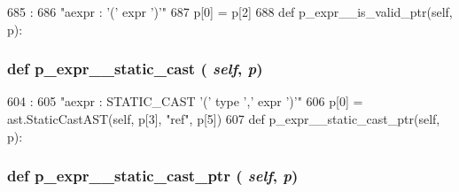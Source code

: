 \begin{DoxyCode}
685                                :
686         "aexpr : '(' expr ')'"
687         p[0] = p[2]
688 
    def p_expr__is_valid_ptr(self, p):
\end{DoxyCode}
\hypertarget{classslicc_1_1parser_1_1SLICC_ae253508b9c4220db9770ebb3e7b3067c}{
\subsubsection[{p\_\-expr\_\-\_\-static\_\-cast}]{\setlength{\rightskip}{0pt plus 5cm}def p\_\-expr\_\-\_\-static\_\-cast ( {\em self}, \/   {\em p})}}
\label{classslicc_1_1parser_1_1SLICC_ae253508b9c4220db9770ebb3e7b3067c}



\begin{DoxyCode}
604                                     :
605         "aexpr : STATIC_CAST '(' type ',' expr ')'"
606         p[0] = ast.StaticCastAST(self, p[3], "ref", p[5])
607 
    def p_expr__static_cast_ptr(self, p):
\end{DoxyCode}
\hypertarget{classslicc_1_1parser_1_1SLICC_a82e8e91f1fd31d30fbf563ddd8bca5f9}{
\subsubsection[{p\_\-expr\_\-\_\-static\_\-cast\_\-ptr}]{\setlength{\rightskip}{0pt plus 5cm}def p\_\-expr\_\-\_\-static\_\-cast\_\-ptr ( {\em self}, \/   {\em p})}}
\label{classslicc_1_1parser_1_1SLICC_a82e8e91f1fd31d30fbf563ddd8bca5f9}



